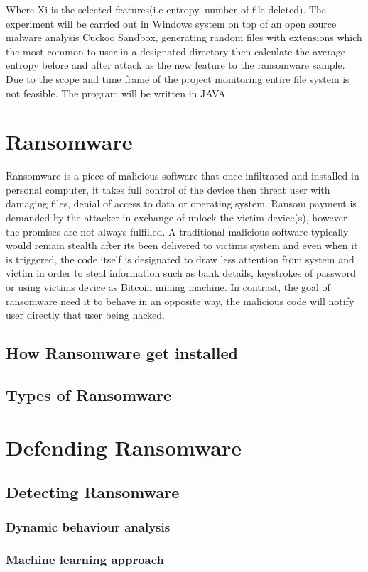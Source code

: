 \documentclass[]{PLR-ShaofengLiu}
\begin{document}
Where Xi is the selected features(i.e entropy, number of file deleted).
The experiment will be carried out in Windows system on top of an open source malware analysis Cuckoo Sandbox, generating random files with extensions which the most common to user in a designated directory then calculate the average entropy before and after attack as the new feature to the ransomware sample. Due to the scope and time frame of the project monitoring entire file system is not feasible. The program will be written in JAVA.
\newpage
\chapter{Ransomware}
Ransomware is a piece of malicious software that once infiltrated and 
installed in personal computer, it takes full control of the device then 
threat user with damaging files, denial of access to data or operating 
system. Ransom payment is demanded by the attacker in exchange of unlock 
the victim device(s), however the promises are not always fulfilled. A 
traditional malicious software typically would remain stealth after  its 
been delivered to victims system and even when it is triggered, 
the code itself is designated to draw less attention from system and 
victim in order to steal information such as bank details, keystrokes 
of password or using victims device as Bitcoin mining machine. 
In contrast, the goal of ransomware need it to behave in an opposite way, 
the malicious code will  notify  user  directly  that  user  being  hacked.
  \section{How Ransomware get installed}
  
  \section{Types of Ransomware}
\chapter{Defending Ransomware}
  \section{Detecting Ransomware}
    \subsection{Dynamic behaviour analysis}
    \subsection{Machine learning approach}
\end{document}
